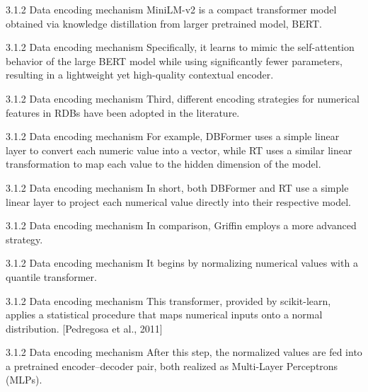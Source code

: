 \documentclass[aspectratio=169,10pt]{beamer}
\newcommand{\cit}[1]{{\scriptsize\color{gray}[#1]}}
\begin{document}
\begin{frame}{3.1.2 Data encoding mechanism}
MiniLM-v2 is a compact transformer model obtained via knowledge distillation from larger pretrained model, BERT.
\end{frame}

\begin{frame}{3.1.2 Data encoding mechanism}
Specifically, it learns to mimic the self-attention behavior of the large BERT model while using significantly fewer parameters, resulting in a lightweight yet high-quality contextual encoder.
\end{frame}

\begin{frame}{3.1.2 Data encoding mechanism}
Third, different encoding strategies for numerical features in RDBs have been adopted in the literature.
\end{frame}

\begin{frame}{3.1.2 Data encoding mechanism}
For example, DBFormer uses a simple linear layer to convert each numeric value into a vector, while RT uses a similar linear transformation to map each value to the hidden dimension of the model.
\end{frame}

\begin{frame}{3.1.2 Data encoding mechanism}
In short, both DBFormer and RT use a simple linear layer to project each numerical value directly into their respective model.
\end{frame}

\begin{frame}{3.1.2 Data encoding mechanism}
In comparison, Griffin employs a more advanced strategy.
\end{frame}

\begin{frame}{3.1.2 Data encoding mechanism}
It begins by normalizing numerical values with a quantile transformer.
\end{frame}

\begin{frame}{3.1.2 Data encoding mechanism}
This transformer, provided by scikit-learn, applies a statistical procedure that maps numerical inputs onto a normal distribution.
\cit{Pedregosa et al., 2011}
\end{frame}

\begin{frame}{3.1.2 Data encoding mechanism}
After this step, the normalized values are fed into a pretrained encoder--decoder pair, both realized as Multi-Layer Perceptrons (MLPs).
\end{frame}
\end{document}
